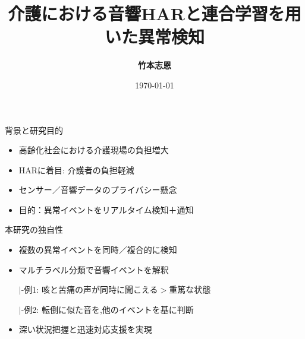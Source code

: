 \documentclass[unicode,12pt,aspectratio=169,dvipdfmx]{beamer}
\title{\textbf{介護における音響HARと連合学習を用いた異常検知}}
\author{\textbf{竹本志恩}}
\institute{\textbf{INIAD}}
\date{\today}
\begin{document}
\begin{frame}
  \titlepage
\end{frame}
\begin{frame}{背景と研究目的}
  \begin{itemize}
    \item 高齢化社会における介護現場の負担増大
    \item HARに着目: 介護者の負担軽減
    \item センサー／音響データのプライバシー懸念
    \item 目的：異常イベントをリアルタイム検知＋通知
  \end{itemize}
\end{frame}
\begin{frame}{本研究の独自性}
  \begin{itemize}
    \item 複数の異常イベントを同時／複合的に検知
    \item マルチラベル分類で音響イベントを解釈
    
    $|$-例1: 咳と苦痛の声が同時に聞こえる$>$重篤な状態
    
    $|$-例2: 転倒に似た音を,他のイベントを基に判断
    \item 深い状況把握と迅速対応支援を実現
  \end{itemize}
\end{frame}
\end{document}
